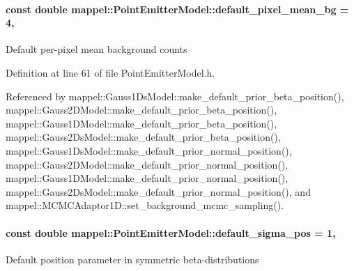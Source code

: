 \paragraph[{\texorpdfstring{default\+\_\+pixel\+\_\+mean\+\_\+bg}{default_pixel_mean_bg}}]{\setlength{\rightskip}{0pt plus 5cm}const double mappel\+::\+Point\+Emitter\+Model\+::default\+\_\+pixel\+\_\+mean\+\_\+bg = 4\hspace{0.3cm}{\ttfamily [static]}, {\ttfamily [inherited]}}\hypertarget{classmappel_1_1PointEmitterModel_abe82d75be8586234657a61e2f137a6c8}{}\label{classmappel_1_1PointEmitterModel_abe82d75be8586234657a61e2f137a6c8}
Default per-\/pixel mean background counts 

Definition at line 61 of file Point\+Emitter\+Model.\+h.



Referenced by mappel\+::\+Gauss1\+Ds\+Model\+::make\+\_\+default\+\_\+prior\+\_\+beta\+\_\+position(), mappel\+::\+Gauss2\+D\+Model\+::make\+\_\+default\+\_\+prior\+\_\+beta\+\_\+position(), mappel\+::\+Gauss1\+D\+Model\+::make\+\_\+default\+\_\+prior\+\_\+beta\+\_\+position(), mappel\+::\+Gauss2\+Ds\+Model\+::make\+\_\+default\+\_\+prior\+\_\+beta\+\_\+position(), mappel\+::\+Gauss1\+Ds\+Model\+::make\+\_\+default\+\_\+prior\+\_\+normal\+\_\+position(), mappel\+::\+Gauss2\+D\+Model\+::make\+\_\+default\+\_\+prior\+\_\+normal\+\_\+position(), mappel\+::\+Gauss1\+D\+Model\+::make\+\_\+default\+\_\+prior\+\_\+normal\+\_\+position(), mappel\+::\+Gauss2\+Ds\+Model\+::make\+\_\+default\+\_\+prior\+\_\+normal\+\_\+position(), and mappel\+::\+M\+C\+M\+C\+Adaptor1\+D\+::set\+\_\+background\+\_\+mcmc\+\_\+sampling().

\paragraph[{\texorpdfstring{default\+\_\+sigma\+\_\+pos}{default_sigma_pos}}]{\setlength{\rightskip}{0pt plus 5cm}const double mappel\+::\+Point\+Emitter\+Model\+::default\+\_\+sigma\+\_\+pos = 1\hspace{0.3cm}{\ttfamily [static]}, {\ttfamily [inherited]}}\hypertarget{classmappel_1_1PointEmitterModel_aa98a73b9e3937c00b07596d3928df3ca}{}\label{classmappel_1_1PointEmitterModel_aa98a73b9e3937c00b07596d3928df3ca}
Default position parameter in symmetric beta-\/distributions 

